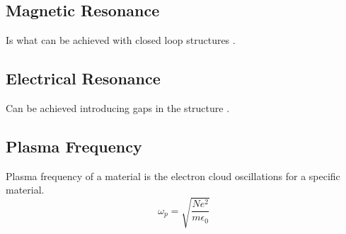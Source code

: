     \subsection{\textsf{Magnetic Resonance}}
        Is what can be achieved with closed loop structures \cite{abdulkarim_review_2022}.
    
    \subsection{\textsf{Electrical Resonance}}
        Can be achieved introducing gaps in the structure \cite{abdulkarim_review_2022}.

    \subsection{\textsf{Plasma Frequency}}
        Plasma frequency of a material is the electron cloud oscillations for a specific material.
        \begin{equation}
            \omega_p = \sqrt{\frac{Ne^2}{m\epsilon_0}}
        \end{equation} 